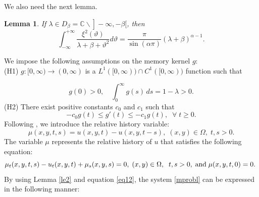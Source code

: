 \documentclass[12pt]{article}
\numberwithin{equation}{section}
\newtheorem{lemma}[theorem]{Lemma}
\begin{document}
We also need the next lemma.\\[0pt]
\begin{lemma}\cite{Pod} If $\left.\lambda \in D_{\beta}=\mathbb{C} \backslash\right]-\infty,-\beta[$, then
$$
\int_{-\infty}^{+\infty} \frac{\xi^{2}(\vartheta)}{\lambda+\beta+\vartheta^{2}} d \vartheta=\frac{\pi}{\sin (\alpha \pi)}(\lambda+\beta)^{\alpha-1} .
$$
\end{lemma}
We impose the following assumptions on the memory kernel $g$:\\
(H1) $g : [0, \infty) \to (0, \infty)$ is a $L^1([0, \infty))\cap C^1([0, \infty))$ function  such that

$$g(0) > 0, \quad  \int_{0}^{\infty} g(s)\,ds = 1 - \lambda > 0.$$
(H2) There exist positive constants $c_0$ and $c_1$ such that
$$-c_0 g(t)\leq g'(t) \leq -c_1 g(t),\;\; \forall\;t\geq 0.$$
Following  \cite{RV2, RV1}, we introduce the relative history variable:
\begin{equation}
    \mu (x,y,t,s) = u(x,y,t)-u(x,y,t-s),\;(x,y)\in\Omega,\; t, s>0.
    \label{eq12}
\end{equation}
The variable $\mu$ represents the relative history of $u$ that satisfies the following equation:
\begin{equation*}\label{2.3m}
    \mu_t (x,y,t,s) - u_t (x,y,t) + \mu_s (x,y,s) = 0,\; (x,y)\in \Omega, \hspace{2mm} t,s > 0,\;\text{and}\;\mu(x,y,t,0)=0.\;
\end{equation*}
{}
By using Lemma \eqref{le2} and equation \eqref{eq12}, the system \eqref{mprobl} can be expressed in the following manner:
\vspace{-1 mm}
\end{document}

